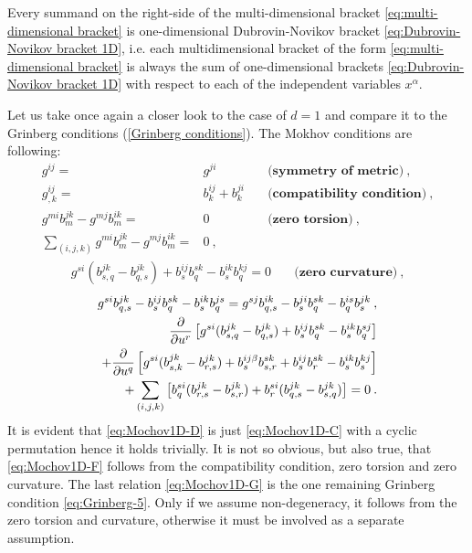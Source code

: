 \begin{lemma}
    Every summand on the right-side of the multi-dimensional bracket \eqref{eq:multi-dimensional bracket} is one-dimensional Dubrovin-Novikov bracket \eqref{eq:Dubrovin-Novikov bracket 1D}, i.e. each multidimensional bracket of the form \eqref{eq:multi-dimensional bracket} is always the sum of one-dimensional brackets \eqref{eq:Dubrovin-Novikov bracket 1D} with respect to each of the independent variables $x^\alpha$.
\end{lemma}


\begin{remark}
    Let us take once again a closer look to the case of $d=1$ and compare it to the Grinberg conditions (\vref{Grinberg conditions}). The Mokhov conditions are following:
    \begin{align}
        g^{ij} =& g^{ji} \quad &\textbf{(symmetry of metric)} \:, \label{eq:Mochov1D-A}\\
        g^{ij}_{,k} =& b^{ij}_k + b^{ji}_k \quad &\textbf{(compatibility condition)} \label{eq:Mochov1D-B}\:, \\
        g^{mi} b^{jk}_m - g^{mj} b^{ik}_m =& 0 \quad &\textbf{(zero torsion)} \:, \label{eq:Mochov1D-C}\\
        \sum_{(i,j,k)} g^{mi} b^{jk}_m - g^{mj} b^{ik}_m =& 0 \:,\quad& \label{eq:Mochov1D-D}
    \end{align}
    \begin{align}
        g^{si} (b^{jk}_{s,q} - b^{jk}_{q,s}) + b^{ij}_s b^{sk}_q - b^{ik}_s b^{kj}_q = 0 \quad &\textbf{(zero curvature)}\:, \label{eq:Mochov1D-E}
    \end{align}
    \begin{align}
        g^{si} b^{j k}_{q,s} - b^{ij}_s b^{s k}_q - b^{i k}_s b^{j s}_q = g^{s j } b^{i k}_{q,s} - b^{ji}_s b^{s k}_q - b^{is}_q b^{jk}_s \:, \label{eq:Mochov1D-F}\\
        \frac{\partial }{\partial u^r} \left[ g^{si} (b^{j k }_{s,q} - b^{j k}_{q,s}) + b^{ij}_s b^{s k}_q - b^{i k}_s b^{s j}_q \right] 
        \nonumber \\+ \frac{\partial }{\partial u^q} \left[ g^{si } (b^{j k}_{s,k} - b^{j k}_{r,s}) + b^{ij \beta}_s b^{s k}_{s,r} + b^{ij}_s b^{s k}_r - b^{ik}_s b^{kj}_s \right] \label{eq:Mochov1D-G}
        \\+ \sum_{(i,j,k)} \left[ b^{si}_q (b^{j k}_{r,s} - b^{j k}_{s,r}) + b^{s i}_r (b^{j k}_{q,s} - b^{j k}_{s,q}) \right] \nonumber
        = 0 \:.
    \end{align}
    It is evident that \eqref{eq:Mochov1D-D} is just \eqref{eq:Mochov1D-C} with a cyclic permutation hence it holds trivially. It is not so obvious, but also true, that \eqref{eq:Mochov1D-F} follows from the compatibility condition, zero torsion and zero curvature. 
     The last relation \eqref{eq:Mochov1D-G} is the one remaining Grinberg condition \eqref{eq:Grinberg-5}. Only if we assume non-degeneracy, it follows from the zero torsion and curvature, otherwise it must be involved as a separate assumption.
\end{remark}


